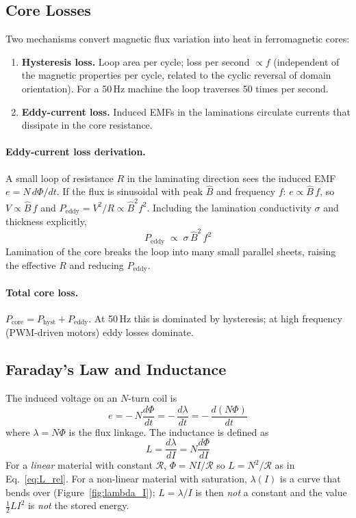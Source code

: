 \documentclass[12pt,a4paper]{article}
\newcommand{\unit}[1]{\ensuremath{\,\mathrm{#1}}}
\begin{document}
\subsection{Core Losses}

Two mechanisms convert magnetic flux variation into heat in
ferromagnetic cores:
\begin{enumerate}[noitemsep]
  \item \textbf{Hysteresis loss.} Loop area per cycle; loss per second
        $\propto f$ (independent of the magnetic properties per cycle,
        related to the cyclic reversal of domain orientation).
        For a 50\unit{Hz} machine the loop traverses 50 times per
        second.
  \item \textbf{Eddy-current loss.} Induced EMFs in the laminations
        circulate currents that dissipate in the core resistance.
\end{enumerate}

\paragraph{Eddy-current loss derivation.}
A small loop of resistance $R$ in the laminating direction sees the
induced EMF $e = N\,d\Phi/dt$.
If the flux is sinusoidal with peak $\hat{B}$ and frequency $f$:
$e \propto \hat{B}\,f$, so $V \propto \hat{B}\,f$ and
$P_\text{eddy} = V^2/R \propto \hat{B}^2 f^2$.
Including the lamination conductivity $\sigma$ and thickness
explicitly,
\begin{equation}
  P_\text{eddy} \;\propto\; \sigma\,\hat{B}^2\,f^2
  \label{eq:peddy}
\end{equation}
Lamination of the core breaks the loop into many small parallel
sheets, raising the effective $R$ and reducing $P_\text{eddy}$.

\paragraph{Total core loss.}
$P_\text{core} = P_\text{hyst} + P_\text{eddy}$.
At 50\unit{Hz} this is dominated by hysteresis; at high frequency
(PWM-driven motors) eddy losses dominate.

\subsection{Faraday's Law and Inductance}

The induced voltage on an $N$-turn coil is
\begin{equation}
  e = -\,N\frac{d\Phi}{dt}
    = -\,\frac{d\lambda}{dt}
    = -\,\frac{d(N\Phi)}{dt}
\end{equation}
where $\lambda = N\Phi$ is the flux linkage.
The inductance is defined as
\begin{equation}
  L = \frac{d\lambda}{dI}
    = N\frac{d\Phi}{dI}
\end{equation}
For a \emph{linear} material with constant $\mathcal{R}$,
$\Phi = NI/\mathcal{R}$ so $L = N^2/\mathcal{R}$ as in
Eq.~\eqref{eq:L_rel}. For a non-linear material with saturation,
$\lambda(I)$ is a curve that bends over (Figure~\ref{fig:lambda_I});
$L = \lambda/I$ is then \emph{not} a constant and the value
$\tfrac{1}{2}LI^2$ is \emph{not} the stored energy.
\end{document}
